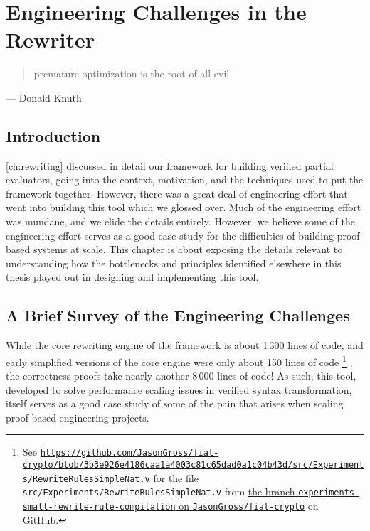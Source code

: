 \chapter{Engineering Challenges in the Rewriter} \label{ch:rewriting-more}

\begin{quote}
  premature optimization is the root of all evil
\end{quote}
\begin{flushright}
  --- Donald Knuth
\end{flushright}

\section{Introduction} \label{sec:rewriting-more:intro}
\autoref{ch:rewriting} discussed in detail our framework for building verified partial evaluators, going into the context, motivation, and the techniques used to put the framework together.
However, there was a great deal of engineering effort that went into building this tool which we glossed over.
Much of the engineering effort was mundane, and we elide the details entirely.
However, we believe some of the engineering effort serves as a good case-study for the difficulties of building proof-based systems at scale.
This chapter is about exposing the details relevant to understanding how the bottlenecks and principles identified elsewhere in this thesis played out in designing and implementing this tool.

\section{A Brief Survey of the Engineering Challenges} \label{sec:rewriting-more:challenges-overview}

While the core rewriting engine of the framework is about 1\,300 lines of code, and early simplified versions of the core engine were only about 150 lines of code%
\footnote{%
See \href{https://web.archive.org/web/20200716002534/https://github.com/JasonGross/fiat-crypto/blob/3b3e926e4186caa1a4003c81c65dad0a1c04b43d/src/Experiments/RewriteRulesSimpleNat.v}{\texttt{https://github.com/JasonGross/fiat-crypto/blob/3b3e926e4186caa1a4003c81c65dad0a1c04b43d/src/Experiments/RewriteRulesSimpleNat.v}} for the file \texttt{src/Experiments/RewriteRulesSimpleNat.v} from \href{https://github.com/JasonGross/fiat-crypto/tree/experiments-small-rewrite-rule-compilation}{the branch \texttt{experiments-small-rewrite-rule-compilation} on \texttt{JasonGross/fiat-crypto}} on GitHub.%
}%
, the correctness proofs take nearly another 8\,000 lines of code!
As such, this tool, developed to solve performance scaling issues in verified syntax transformation, itself serves as a good case study of some of the pain that arises when scaling proof-based engineering projects.

